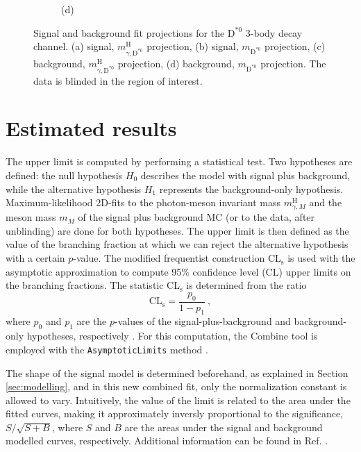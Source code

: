 \begin{figure}[!ht]
\begin{subfigure}[t]{0.50\mylength}
        \vspace*{-0.2cm}
        \caption{\footnotesize (d)}
    \end{subfigure}%
\caption{Signal and background fit projections for the $\text{D}^{*0}$ 3-body decay channel. (a) signal, $m^{\text{H}}_{\gamma, \text{D}^{*0}}$ projection, (b) signal, $m_{\text{D}^{*0}}$ projection, (c) background, $m^{\text{H}}_{\gamma, \text{D}^{*0}}$ projection, (d) background, $m_{\text{D}^{*0}}$ projection. The data is blinded in the region of interest.}
\label{fig:sig_bkg_modelling_d0star_3body}
    \vspace*{-0.0cm}
\end{figure}

\section{Estimated results}\label{sec:results}

The upper limit is computed by performing a statistical test. Two hypotheses are defined: the null hypothesis $H_0$ describes the model with signal plus background, while the alternative hypothesis $H_1$ represents the background-only hypothesis. Maximum-likelihood 2D-fits to the photon-meson invariant mass $m^{\text{H}}_{\gamma, M}$ and the meson mass $m_{M}$ of the signal plus background MC (or to the data, after unblinding) are done for both hypotheses. The upper limit is then defined as the value of the branching fraction at which we can reject the alternative hypothesis with a certain $p$-value. The modified frequentist construction CL$_\text{s}$ \cite{Read:2002hq, Junk:1999kv} is used with the asymptotic approximation \cite{Cowan:2010js} to compute 95\% confidence level (CL) upper limits on the branching fractions. The statistic CL$_\text{s}$ is determined from the ratio
\begin{equation*}
    \text{CL}_{\text{s}} = \frac{p_0}{1-p_1}\ ,
\end{equation*}
where $p_0$ and $p_1$ are the $p$-values of the signal-plus-background and background-only hypotheses, respectively \cite{PDG}. For this computation, the Combine tool is employed with the \verb+AsymptoticLimits+ method \cite{CMS:Combine}.

The shape of the signal model is determined beforehand, as explained in Section \ref{sec:modelling}, and in this new combined fit, only the normalization constant is allowed to vary. Intuitively, the value of the limit is related to the area under the fitted curves, making it approximately inversly proportional to the significance, $S/\sqrt{S+B}$, where $S$ and $B$ are the areas under the signal and background modelled curves, respectively. Additional information can be found in Ref. \cite{Cowan:2010js}.

